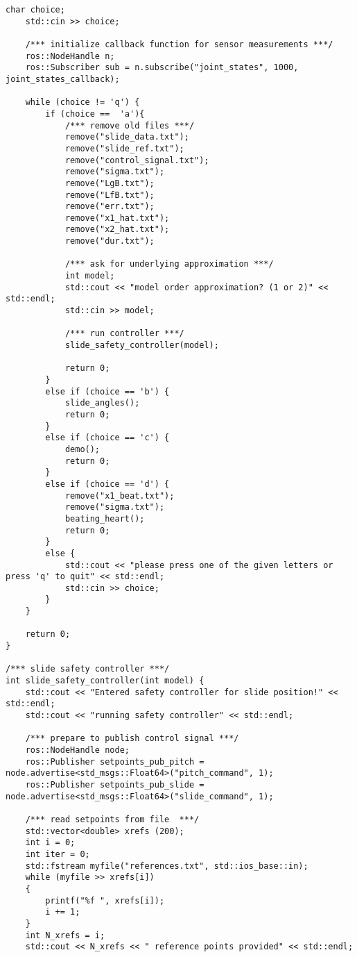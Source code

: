 \begin{lstlisting}[language=gedit]
    char choice;
    std::cin >> choice;

    /*** initialize callback function for sensor measurements ***/
    ros::NodeHandle n;
    ros::Subscriber sub = n.subscribe("joint_states", 1000, joint_states_callback);

    while (choice != 'q') {
        if (choice ==  'a'){
            /*** remove old files ***/
            remove("slide_data.txt"); 
            remove("slide_ref.txt");
            remove("control_signal.txt");
            remove("sigma.txt");
            remove("LgB.txt");
            remove("LfB.txt");
            remove("err.txt");
            remove("x1_hat.txt");
            remove("x2_hat.txt");
            remove("dur.txt");

            /*** ask for underlying approximation ***/ 
            int model;
            std::cout << "model order approximation? (1 or 2)" << std::endl;
            std::cin >> model;

            /*** run controller ***/
            slide_safety_controller(model);

            return 0;
        }
        else if (choice == 'b') {
            slide_angles();
            return 0;
        }
        else if (choice == 'c') {
            demo();
            return 0;
        }
        else if (choice == 'd') {
            remove("x1_beat.txt"); 
            remove("sigma.txt"); 
            beating_heart();
            return 0;
        }
        else {
            std::cout << "please press one of the given letters or press 'q' to quit" << std::endl;
            std::cin >> choice;
        }
    }

    return 0;
}

/*** slide safety controller ***/
int slide_safety_controller(int model) {
    std::cout << "Entered safety controller for slide position!" << std::endl;
    std::cout << "running safety controller" << std::endl;
   
    /*** prepare to publish control signal ***/ 
    ros::NodeHandle node;
    ros::Publisher setpoints_pub_pitch = node.advertise<std_msgs::Float64>("pitch_command", 1);
    ros::Publisher setpoints_pub_slide = node.advertise<std_msgs::Float64>("slide_command", 1);

    /*** read setpoints from file  ***/
    std::vector<double> xrefs (200);
    int i = 0;
    int iter = 0;
    std::fstream myfile("references.txt", std::ios_base::in);
    while (myfile >> xrefs[i])
    {
        printf("%f ", xrefs[i]);
        i += 1; 
    }
    int N_xrefs = i;
    std::cout << N_xrefs << " reference points provided" << std::endl;


\end{lstlisting}
